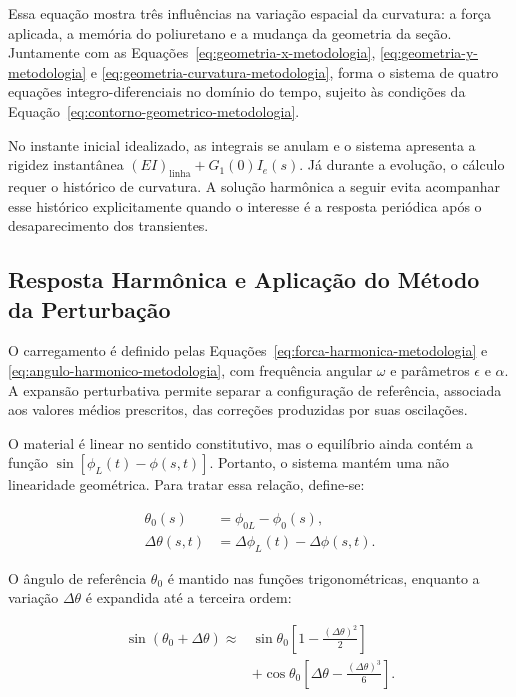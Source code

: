 \documentclass[arial,centeredequations,english,brazilian,oneside,section=TITLE]{ifes8}
\begin{document}
Essa equação mostra três influências na variação espacial da curvatura:
a força aplicada, a memória do poliuretano e a mudança da geometria da seção.
Juntamente com as Equações~\eqref{eq:geometria-x-metodologia},
\eqref{eq:geometria-y-metodologia} e
\eqref{eq:geometria-curvatura-metodologia}, forma o sistema de quatro equações
integro-diferenciais no domínio do tempo, sujeito às condições da
Equação~\eqref{eq:contorno-geometrico-metodologia}.

No instante inicial idealizado, as integrais se anulam e o sistema apresenta a
rigidez instantânea $(EI)_{\mathrm{linha}}+G_1(0)I_e(s)$. Já durante a evolução,
o cálculo requer o histórico de curvatura. A solução harmônica a seguir evita
acompanhar esse histórico explicitamente quando o interesse é a resposta
periódica após o desaparecimento dos transientes.

\subsection{Resposta Harmônica e Aplicação do Método da Perturbação}
\label{sec:aplicacao-metodo-perturbacao}

O carregamento é definido pelas
Equações~\eqref{eq:forca-harmonica-metodologia} e
\eqref{eq:angulo-harmonico-metodologia}, com frequência angular $\omega$ e
parâmetros $\epsilon$ e $\alpha$. A expansão perturbativa permite separar a
configuração de referência, associada aos valores médios prescritos, das
correções produzidas por suas oscilações.

O material é linear no sentido constitutivo, mas o equilíbrio ainda contém a
função $\sin[\phi_L(t)-\phi(s,t)]$. Portanto, o sistema mantém uma não
linearidade geométrica. Para tratar essa relação, define-se:

\begin{align}
  \theta_0(s)&=\phi_{0L}-\phi_0(s),
    \label{eq:angulo-relativo-referencia}\\
  \Delta\theta(s,t)&=\Delta\phi_L(t)-\Delta\phi(s,t).
    \label{eq:perturbacao-angulo-relativo}
\end{align}

O ângulo de referência $\theta_0$ é mantido nas funções trigonométricas, enquanto
a variação $\Delta\theta$ é expandida até a terceira ordem:

\begin{equation}
  \begin{aligned}
    \sin(\theta_0+\Delta\theta)\approx{}&
      \sin\theta_0\left[1-\frac{(\Delta\theta)^2}{2}\right]\\
      &+\cos\theta_0\left[\Delta\theta-\frac{(\Delta\theta)^3}{6}\right].
  \end{aligned}
  \label{eq:taylor-angulo-relativo}
\end{equation}
\end{document}
